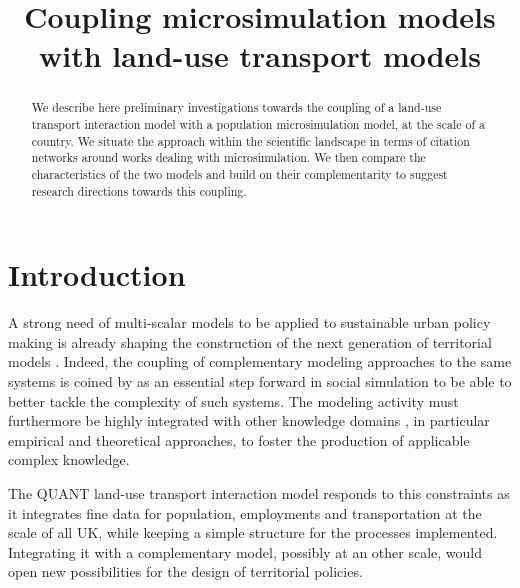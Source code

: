 



\title{Coupling microsimulation models with land-use transport models}

\date{}

\maketitle

\justify


\begin{abstract}
	We describe here preliminary investigations towards the coupling of a land-use transport interaction model with a population microsimulation model, at the scale of a country. We situate the approach within the scientific landscape in terms of citation networks around works dealing with microsimulation. We then compare the characteristics of the two models and build on their complementarity to suggest research directions towards this coupling. 
\end{abstract}




\section{Introduction}


A strong need of multi-scalar models to be applied to sustainable urban policy making is already shaping the construction of the next generation of territorial models \cite{Rozenblat2018}. Indeed, the coupling of complementary modeling approaches to the same systems is coined by \cite{banos2013pour} as an essential step forward in social simulation to be able to better tackle the complexity of such systems. The modeling activity must furthermore be highly integrated with other knowledge domains \cite{raimbault2017applied}, in particular empirical and theoretical approaches, to foster the production of applicable complex knowledge.

The QUANT land-use transport interaction model \cite{batty2019generalized} responds to this constraints as it integrates fine data for population, employments and transportation at the scale of all UK, while keeping a simple structure for the processes implemented. Integrating it with a complementary model, possibly at an other scale, would open new possibilities for the design of territorial policies.

